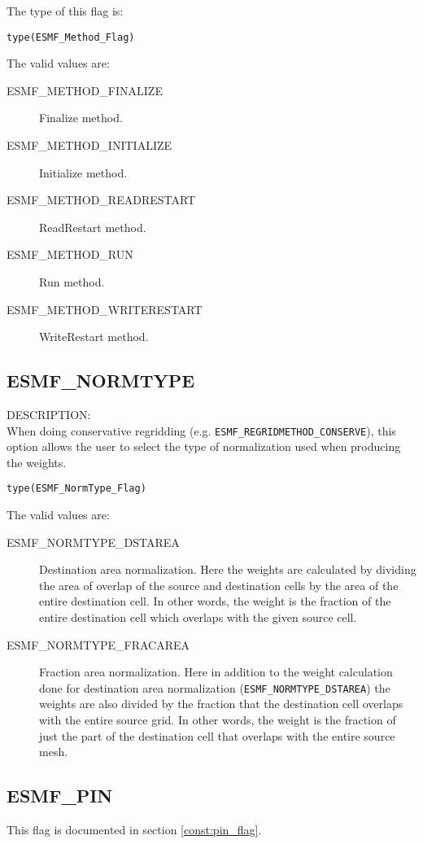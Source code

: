 The type of this flag is:

{\tt type(ESMF\_Method\_Flag)}

The valid values are:
\begin{description}
\item [ESMF\_METHOD\_FINALIZE]
      Finalize method.
\item [ESMF\_METHOD\_INITIALIZE]
      Initialize method.
\item [ESMF\_METHOD\_READRESTART]
      ReadRestart method.
\item [ESMF\_METHOD\_RUN]
      Run method.
\item [ESMF\_METHOD\_WRITERESTART]
      WriteRestart method.
\end{description}


\subsection{ESMF\_NORMTYPE}

\label{opt:normType}

{\sf DESCRIPTION:\\}  When doing conservative regridding (e.g. {\tt ESMF\_REGRIDMETHOD\_CONSERVE}), this option allows the user to select the type of normalization used when producing the weights. 

{\tt type(ESMF\_NormType\_Flag)}

The valid values are:
 \begin{description}
\item [ESMF\_NORMTYPE\_DSTAREA]
 Destination area normalization. Here the weights are calculated by dividing the area of overlap of the source and 
 destination cells by the area of the entire destination cell. In other words, the weight is the fraction of the 
 entire destination cell which overlaps with the given source cell. 
\item [ESMF\_NORMTYPE\_FRACAREA]
   Fraction area normalization. Here in addition to the weight calculation done for destination area normalization 
({\tt ESMF\_NORMTYPE\_DSTAREA}) the weights are also divided by the fraction that the destination cell overlaps with
  the entire source grid. In other words, the weight is the fraction of just the part of the destination cell that 
  overlaps with the entire source mesh.  
\end{description}


\subsection{ESMF\_PIN}
This flag is documented in section \ref{const:pin_flag}.

